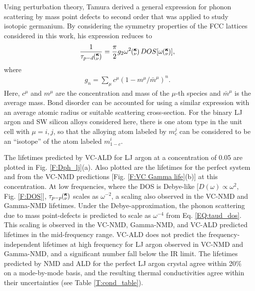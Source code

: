 Using perturbation theory, Tamura derived a general expression for 
phonon scattering by mass point defects to second order that was applied 
to study isotopic germanium.\cite{tamura_isotope_1983}   
By considering the symmetry properties of the FCC lattices 
considered in this work, his expression reduces to 
\begin{equation}\label{EQ:taud_dos}
\begin{split}
\frac{1}{\tau_{p-d}\kv} =\frac{\pi}{2} g_2 \omega^2\kv DOS[\omega\kv], 
\end{split}
\end{equation}
where  
\begin{equation}\label{EQ:gn}
\begin{split}
g_n = \sum_\mu c^{\mu}(1-m^{\mu}/\bar{m}^{\mu})^n.
\end{split}
\end{equation}
Here, $c^\mu$ and $m^\mu$ are the concentration and  
mass of the $\mu$-th species 
and $\bar{m}^{\mu}$ is the average mass. Bond disorder 
can be accounted for using a similar expression with an average
atomic radius or suitable scattering cross-section.
\cite{klemens_scattering_1955,klemens_thermal_1957} 
For the binary LJ argon and SW silicon alloys considered here, 
there is one atom type in the unit cell  
with $\mu=i,j$, so that the alloying atom labeled by $m^j_{c}$ 
can be considered to be an ``isotope'' of the atom labeled 
$m^i_{1-c}$.

The lifetimes predicted by VC-ALD for LJ argon at a concentration 
of 0.05 are plotted in Fig. \ref{F:Dph_lj}(a).\cite{vc_fn2}    
Also plotted are the lifetimes for the perfect system and from the 
VC-NMD predictions [Fig. \ref{F:VC Gamma life}(b)] at this 
concentration. At low frequencies, where the DOS is Debye-like 
[$D(\omega) \propto \omega^{2}$, Fig. \ref{F:DOS}], 
$\tau_{p-p}\mspace{-4.0mu}\left(\mspace{-8.0mu} \begin{smallmatrix}&\pmb{\kappa} \\&\nu \end{smallmatrix}\mspace{-3.0mu}\right)$ scales as $\omega^{-2}$, 
a scaling also observed in the VC-NMD and Gamma-NMD lifetimes. 
Under the Debye-approximation, 
the phonon scattering due to mass point-defects 
is predicted to scale as $\omega^{-4}$ from Eq. \eqref{EQ:taud_dos}.
\cite{mattis_phonon_1957,tamura_isotope_1983} 
This scaling is observed in the VC-NMD, Gamma-NMD, and VC-ALD 
predicted lifetimes in the mid-frequency range.  
VC-ALD does not predict the frequency-independent lifetimes 
at high frequency for LJ argon observed in VC-NMD and Gamma-NMD,  
and a significant number fall below the IR limit. 
The lifetimes predicted by 
NMD and ALD for the perfect LJ argon crystal agree 
within 20$\%$ on a mode-by-mode basis, and the 
resulting thermal conductivities agree within their uncertainties 
(see Table \ref{T:cond_table}).

